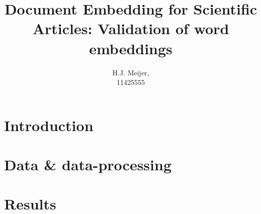 \documentclass[10pt,a4paper]{article}
\newcommand{\mainheader}[1]{\section{#1}}
\begin{document}
\begin{titlepage}
\title{Document Embedding for Scientific Articles: Validation of word embeddings}
\author{H.J. Meijer,\\11425555}
\clearpage\maketitle\thispagestyle{empty}

\end{titlepage}

\mainheader{Introduction}


\clearpage

\clearpage

\mainheader{Data \& data-processing}

\clearpage

\mainheader{Results}

\clearpage



\clearpage



\end{document}
